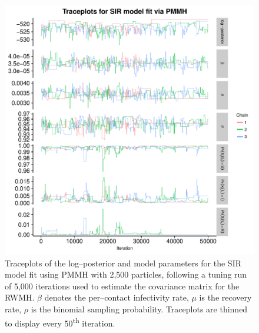 \begin{figure}[htbp]
	\centering
	\includegraphics[width=0.9\linewidth]{figures/misspec_sir_pmmh_traceplots.pdf}
	\caption{Traceplots of the log--posterior and model parameters for the SIR model fit using PMMH with 2,500 particles, following a tuning run of 5,000 iterations used to estimate the covariance matrix for the RWMH. $ \beta $ denotes the per--contact infectivity rate, $ \mu $ is the recovery rate, $ \rho $ is the binomial sampling probability. Traceplots are thinned to display every 50\textsuperscript{th} iteration.}
	\label{fig:misspec_sir_pmmh_traceplots}
\end{figure}

